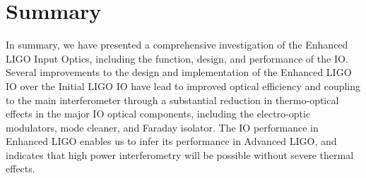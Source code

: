\section{Summary}
\label{sec:summary}
In summary, we have presented a comprehensive investigation of the
Enhanced LIGO Input Optics, including the function, design, and
performance of the IO.  Several improvements to the design and
implementation of the Enhanced LIGO IO over the Initial LIGO IO have
lead to improved optical efficiency and coupling to the main
interferometer through a substantial reduction in thermo-optical
effects in the major IO optical components, including the
electro-optic modulators, mode cleaner, and Faraday isolator.  The IO
performance in Enhanced LIGO enables us to infer its performance in
Advanced LIGO, and indicates that high power interferometry will be
possible without severe thermal effects.



